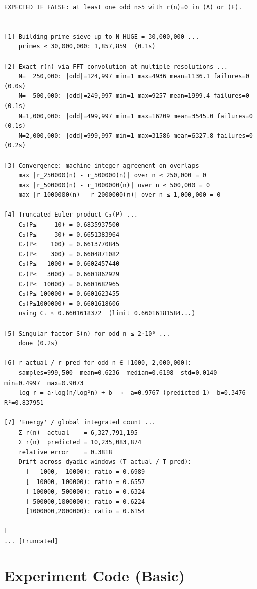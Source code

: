 \documentclass[11pt]{article}
\begin{document}
\begin{lstlisting}
EXPECTED IF FALSE: at least one odd n>5 with r(n)=0 in (A) or (F).


[1] Building prime sieve up to N_HUGE = 30,000,000 ...
    primes ≤ 30,000,000: 1,857,859  (0.1s)

[2] Exact r(n) via FFT convolution at multiple resolutions ...
    N=  250,000: |odd|=124,997 min=1 max=4936 mean=1136.1 failures=0  (0.0s)
    N=  500,000: |odd|=249,997 min=1 max=9257 mean=1999.4 failures=0  (0.1s)
    N=1,000,000: |odd|=499,997 min=1 max=16209 mean=3545.0 failures=0  (0.1s)
    N=2,000,000: |odd|=999,997 min=1 max=31586 mean=6327.8 failures=0  (0.2s)

[3] Convergence: machine-integer agreement on overlaps
    max |r_250000(n) - r_500000(n)| over n ≤ 250,000 = 0
    max |r_500000(n) - r_1000000(n)| over n ≤ 500,000 = 0
    max |r_1000000(n) - r_2000000(n)| over n ≤ 1,000,000 = 0

[4] Truncated Euler product C₂(P) ...
    C₂(P≤     10) = 0.6835937500
    C₂(P≤     30) = 0.6651383964
    C₂(P≤    100) = 0.6613770845
    C₂(P≤    300) = 0.6604871082
    C₂(P≤   1000) = 0.6602457440
    C₂(P≤   3000) = 0.6601862929
    C₂(P≤  10000) = 0.6601682965
    C₂(P≤ 100000) = 0.6601623455
    C₂(P≤1000000) = 0.6601618606
    using C₂ ≈ 0.6601618372  (limit 0.66016181584...)

[5] Singular factor S(n) for odd n ≤ 2·10⁶ ...
    done (0.2s)

[6] r_actual / r_pred for odd n ∈ [1000, 2,000,000]:
    samples=999,500  mean=0.6236  median=0.6198  std=0.0140  min=0.4997  max=0.9073
    log r = a·log(n/log²n) + b  →  a=0.9767 (predicted 1)  b=0.3476  R²=0.837951

[7] 'Energy' / global integrated count ...
    Σ r(n)  actual    = 6,327,791,195
    Σ r(n)  predicted = 10,235,083,874
    relative error    = 0.3818
    Drift across dyadic windows (T_actual / T_pred):
      [   1000,  10000): ratio = 0.6989
      [  10000, 100000): ratio = 0.6557
      [ 100000, 500000): ratio = 0.6324
      [ 500000,1000000): ratio = 0.6224
      [1000000,2000000): ratio = 0.6154

[
... [truncated]
\end{lstlisting}


\section{Experiment Code (Basic)}
\end{document}

